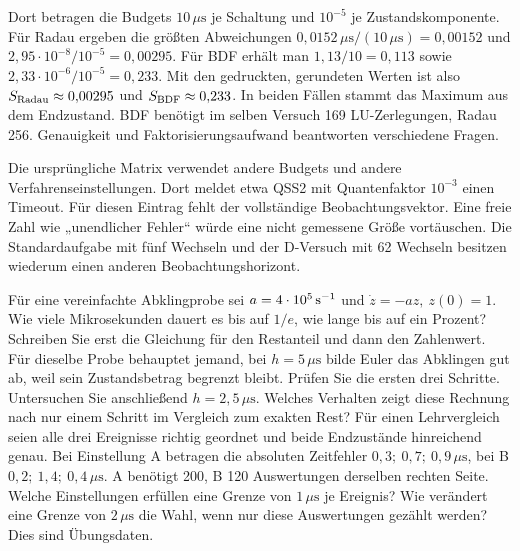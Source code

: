 Dort betragen die Budgets \(10\,\mu\mathrm{s}\) je Schaltung und \(10^{-5}\) je Zustandskomponente. Für Radau ergeben die größten Abweichungen \(0{,}0152\,\mu\mathrm{s}/(10\,\mu\mathrm{s})=0{,}00152\) und \(2{,}95\cdot10^{-8}/10^{-5}=0{,}00295\). Für BDF erhält man \(1{,}13/10=0{,}113\) sowie \(2{,}33\cdot10^{-6}/10^{-5}=0{,}233\). Mit den gedruckten, gerundeten Werten ist also \(S_{\rm Radau}\approx0{,}00295\) und \(S_{\rm BDF}\approx0{,}233\). In beiden Fällen stammt das Maximum aus dem Endzustand. BDF benötigt im selben Versuch 169 LU-Zerlegungen, Radau 256. Genauigkeit und Faktorisierungsaufwand beantworten verschiedene Fragen.

Die ursprüngliche Matrix verwendet andere Budgets und andere Verfahrenseinstellungen. Dort meldet etwa QSS2 mit Quantenfaktor \(10^{-3}\) einen Timeout. Für diesen Eintrag fehlt der vollständige Beobachtungsvektor. Eine freie Zahl wie „unendlicher Fehler“ würde eine nicht gemessene Größe vortäuschen. Die Standardaufgabe mit fünf Wechseln und der D-Versuch mit 62 Wechseln besitzen wiederum einen anderen Beobachtungshorizont.


Für eine vereinfachte Abklingprobe sei \(a=4\cdot10^5\,\mathrm{s^{-1}}\) und \(\dot z=-az,\ z(0)=1\). Wie viele Mikrosekunden dauert es bis auf \(1/e\), wie lange bis auf ein Prozent? Schreiben Sie erst die Gleichung für den Restanteil und dann den Zahlenwert.
Für dieselbe Probe behauptet jemand, bei \(h=5\,\mu\mathrm s\) bilde Euler das Abklingen gut ab, weil sein Zustandsbetrag begrenzt bleibt. Prüfen Sie die ersten drei Schritte. Untersuchen Sie anschließend \(h=2{,}5\,\mu\mathrm s\). Welches Verhalten zeigt diese Rechnung nach nur einem Schritt im Vergleich zum exakten Rest?
Für einen Lehrvergleich seien alle drei Ereignisse richtig geordnet und beide Endzustände hinreichend genau. Bei Einstellung A betragen die absoluten Zeitfehler \(0{,}3;\ 0{,}7;\ 0{,}9\,\mu\mathrm s\), bei B \(0{,}2;\ 1{,}4;\ 0{,}4\,\mu\mathrm s\). A benötigt 200, B 120 Auswertungen derselben rechten Seite. Welche Einstellungen erfüllen eine Grenze von \(1\,\mu\mathrm s\) je Ereignis? Wie verändert eine Grenze von \(2\,\mu\mathrm s\) die Wahl, wenn nur diese Auswertungen gezählt werden? Dies sind Übungsdaten.

